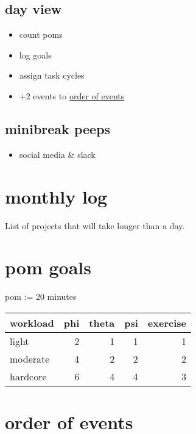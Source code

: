 \documentclass[]{book}
\providecommand{\tightlist}{%
  \setlength{\itemsep}{0pt}\setlength{\parskip}{0pt}}
\begin{document}
\hypertarget{day-view-1}{%
\subsection{day view}\label{day-view-1}}

\begin{itemize}
\tightlist
\item
  count poms
\item
  log goals
\item
  assign task cycles
\item
  +2 events to \protect\hyperlink{order-of-events}{order of events}
\end{itemize}

\hypertarget{minibreak-peeps}{%
\subsection{minibreak peeps}\label{minibreak-peeps}}

\begin{itemize}
\tightlist
\item
  social media \& slack
\end{itemize}

\hypertarget{monthly-log}{%
\section{monthly log}\label{monthly-log}}

List of projects that will take longer than a day.

\hypertarget{pom-goals}{%
\section{pom goals}\label{pom-goals}}

pom := 20 minutes

\begin{tabular}{l|r|r|r|r}
\hline
workload & phi & theta & psi & exercise\\
\hline
light & 2 & 1 & 1 & 1\\
\hline
moderate & 4 & 2 & 2 & 2\\
\hline
hardcore & 6 & 4 & 4 & 3\\
\hline
\end{tabular}

\hypertarget{order-of-events}{%
\section{order of events}\label{order-of-events}}
\end{document}
